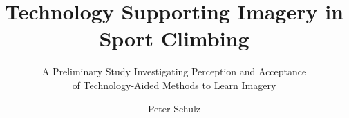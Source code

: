 \documentclass{scrartcl}%
\begin{document}
\subject{\normalfont Universität Bremen $\cdot$ Independent Study $\cdot$ Sommersemester 2016}%
\title{Technology Supporting Imagery in Sport Climbing}%
\subtitle{A Preliminary Study Investigating Perception and Acceptance\\of Technology-Aided Methods to Learn Imagery}%
\author{Peter Schulz}%
\publishers{}%
\maketitle%



\printbibliography

\begin{appendices}

\end{appendices}
\end{document}
